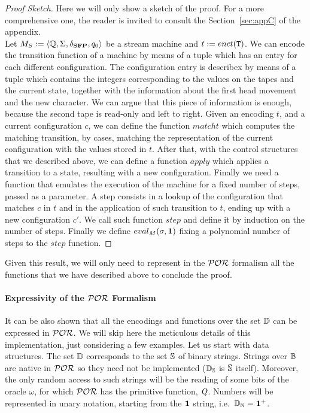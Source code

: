 \begin{proof}[Proof Sketch]
Here we will only show a sketch of the proof. For a more comprehensive one,
the reader is invited to consult the Section~\ref{sec:appC} of the appendix.
\\
Let $M_{S}:= \langle \mathbb{Q},\Sigma, \delta_{\mathbf{SFP}},q_0 \rangle$
be a stream machine and $t:= enct(\mathtt{T})$.
We can encode the transition function of a machine by means of
a tuple which has an entry for each different configuration.
The configuration entry is describex by means of a tuple which contains
the integers corresponding to the values on the tapes and the current state,
together with the information about the first head movement and the new character.
We can argue that this piece of information is enough, because the second
tape is read-only and left to right.
%
Given an encoding $t$, and a current configuration $c$, we can define
the function $matcht$ which computes the matching transition, by cases,
matching the representation of the current configuration with the values
stored in $t$.
%
After that, with the control structures that we described above,
we can define a function $apply$ which applies a transition to a state,
resulting with a new configuration.
%
Finally we need a function that emulates the execution of the machine
for a fixed number of steps, passed as a parameter. A step consists in a lookup
of the configuration that matches $c$ in $t$ and in the application of such
transition to $t$, ending up with a new configuration $c'$. We call such function
$step$ and define it by induction on the number of steps.
%
Finally we define $eval_M(\sigma, \mathbf{1})$ fixing a polynomial number of
steps to the $step$ function.

\end{proof}
%
\noindent
Given this result,
we will only need to represent in the
$\mathcal{POR}$ formalism
all the functions that we have described above
to conclude the proof.












\paragraph{Expressivity of the $\mathcal{POR}$ Formalism}

It can be also shown that all the encodings
and functions over the set $\mathbb{D}$
can be expressed in $\mathcal{POR}$.
We will skip here the meticulous details
of this implementation, just considering a few examples.
Let us start with data structures.
The set $\mathbb{D}$ corresponds to the set $\mathbb{S}$
of binary strings.
Strings over $\mathbb{B}$ are native
in $\mathcal{POR}$ so they need not be implemented
($\mathbb{D}_{\mathbb{S}}$ is $\mathbb{S}$ itself).
Moreover, the only random access to such strings
will be the reading of some bits of the oracle
$\omega$, for which $\mathcal{POR}$ has the primitive
function, $\emph{Q}$.
Numbers will be represented in unary notation,
starting from the $\mathbf{1}$ string,
i.e.~$\mathbb{D}_{\mathbb{N}}=\mathbf{1}^+$.

